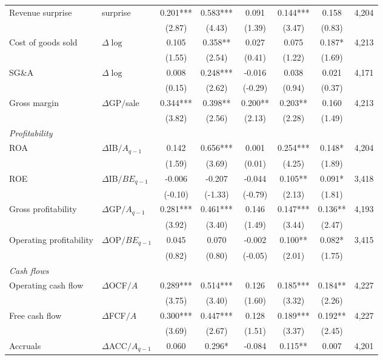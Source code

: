 \begin{table}[!htbp]
\begin{tabular*}{\linewidth}{@{\extracolsep{\fill}}llcccccr}
\quad Revenue surprise & surprise & 0.201*** & 0.583*** & 0.091 & 0.144*** & 0.158 & 4,204 \\
 &  & (2.87) & (4.43) & (1.39) & (3.47) & (0.83) &  \\
\quad Cost of goods sold & $\Delta\log$ & 0.105 & 0.358** & 0.027 & 0.075 & 0.187* & 4,213 \\
 &  & (1.55) & (2.54) & (0.41) & (1.22) & (1.69) &  \\
\quad SG\&A & $\Delta\log$ & 0.008 & 0.248*** & -0.016 & 0.038 & 0.021 & 4,171 \\
 &  & (0.15) & (2.62) & (-0.29) & (0.94) & (0.37) &  \\
\quad Gross margin & $\Delta$GP$/$sale & 0.344*** & 0.398** & 0.200** & 0.203** & 0.160 & 4,213 \\
 &  & (3.82) & (2.56) & (2.13) & (2.28) & (1.49) &  \\
\multicolumn{8}{l}{\emph{Profitability}} \\
\quad ROA & $\Delta$IB$/A_{q-1}$ & 0.142 & 0.656*** & 0.001 & 0.254*** & 0.148* & 4,204 \\
 &  & (1.59) & (3.69) & (0.01) & (4.25) & (1.89) &  \\
\quad ROE & $\Delta$IB$/BE_{q-1}$ & -0.006 & -0.207 & -0.044 & 0.105** & 0.091* & 3,418 \\
 &  & (-0.10) & (-1.33) & (-0.79) & (2.13) & (1.81) &  \\
\quad Gross profitability & $\Delta$GP$/A_{q-1}$ & 0.281*** & 0.461*** & 0.146 & 0.147*** & 0.136** & 4,193 \\
 &  & (3.92) & (3.40) & (1.49) & (3.44) & (2.47) &  \\
\quad Operating profitability & $\Delta$OP$/BE_{q-1}$ & 0.045 & 0.070 & -0.002 & 0.100** & 0.082* & 3,415 \\
 &  & (0.82) & (0.80) & (-0.05) & (2.01) & (1.75) &  \\
\multicolumn{8}{l}{\emph{Cash flows}} \\
\quad Operating cash flow & $\Delta$OCF$/A$ & 0.289*** & 0.514*** & 0.126 & 0.185*** & 0.184** & 4,227 \\
 &  & (3.75) & (3.40) & (1.60) & (3.32) & (2.26) &  \\
\quad Free cash flow & $\Delta$FCF$/A$ & 0.300*** & 0.447*** & 0.128 & 0.189*** & 0.192** & 4,227 \\
 &  & (3.69) & (2.67) & (1.51) & (3.37) & (2.45) &  \\
\quad Accruals & $\Delta$ACC$/A_{q-1}$ & 0.060 & 0.296* & -0.084 & 0.115** & 0.007 & 4,201 \\

\end{tabular*}
\end{table}
